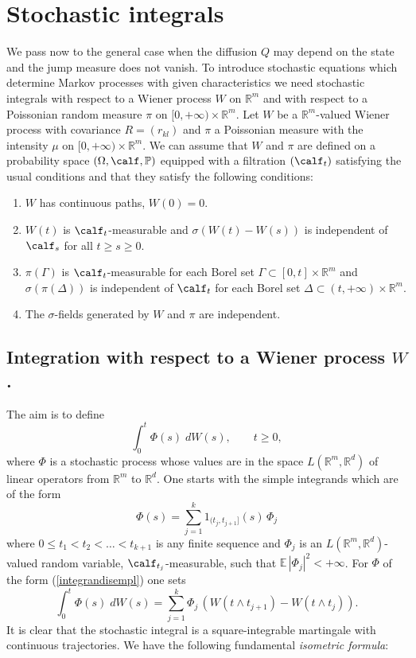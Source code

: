 \documentclass[preprint]{imsart}
\def\P{\mathbb P}
\def\E{\mathbb E}
\def\R{\mathbb R}
\begin{document}
{\section{Stochastic integrals}

We pass now to the general case when the diffusion $Q$ may depend
on the state and the jump measure does not vanish.
To introduce stochastic equations which determine Markov processes
with given characteristics we need stochastic
integrals with respect to a Wiener process $W$ on $\R^m$ and with
respect to a Poissonian random measure $\pi$ on $[0,+\infty)\times
\R^m$. Let  $W$ be  a $\R^m$-valued Wiener process
with covariance $R=(r_{kl})$ and  $\pi$  a
Poissonian measure with the intensity $\mu$ on $[0,+\infty)\times
\R^m$. We can assume that $W$ and $\pi$ are defined on a probability
space $(\Omega,\calf,\P)$ equipped with a filtration $(\calf_t)$
satisfying the usual conditions and that they satisfy the
following conditions:
\begin{enumerate}
  \item[1)] $W$ has continuous paths, $W(0)=0$.
  \item[2)] $W(t)$ is $\calf_t$-measurable and $\sigma(W(t)-W(s))$
  is independent of $\calf_s$ for all $t\ge s\ge0$.
  \item[3) ] $\pi(\Gamma)$ is $\calf_t$-measurable for each Borel
  set $\Gamma\subset [0,t]\times \R^m$
  and $\sigma(\pi(\Delta))$
  is independent of $\calf_t$ for each Borel set
  $\Delta\subset (t,+\infty)\times \R^m$.
  \item[4) ] The $\sigma$-fields generated by $W$ and $\pi$ are
  independent.
\end{enumerate}

\subsection{Integration  with respect to a Wiener process $W$.}

The aim is to define
$$
\int_0^t \Phi(s)\; dW(s),\qquad t\ge0,
$$
where $\Phi$ is a stochastic process whose values are in the space
$L(\R^m,\R^d)$ of linear operators from
$\R^m$ to $\R^d$. One starts with the simple integrands which are
of the form
\begin{equation}\label{integrandisempl}
  \Phi(s)=\sum_{j=1}^k 1_{(t_j,t_{j+1}]}(s)\, \Phi_j
\end{equation}
where $0\le t_1<t_2<\ldots<t_{k+1}$ is any finite sequence
and $\Phi_j$ is an $L(\R^m,\R^d)$-valued random variable,
$\calf_{t_j}$-measurable, such that $\E\, |\Phi_j|^2<+\infty$.
For $\Phi$ of the form
(\ref{integrandisempl}) one sets
$$
\int_0^t \Phi(s)\; dW(s)=
\sum_{j=1}^k\Phi_j\, ( W(t\wedge t_{j+1})-W(t\wedge t_j)).
$$
It is clear that the stochastic integral is a square-integrable
martingale with continuous trajectories. We have the following
fundamental {\em  isometric formula}:

}
\end{document}
